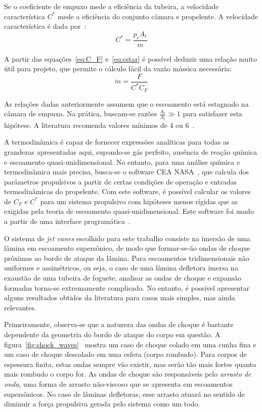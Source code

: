 Se o coeficiente de empuxo mede a eficiência da tubeira, a velocidade característica \(C^*\) mede a eficiência do conjunto câmara e propelente. A velocidade característica é dada por~\cite{Sutton}:
\begin{equation}
    \label{eq:cstar}
    C^* = \frac{p_c A_t}{\dot{m}}
\end{equation}

A partir das equações~\ref{eq:C_F} e~\ref{eq:cstar} é possível deduzir uma relação muito útil para projeto, que permite o cálculo fácil da vazão mássica necessária:
\begin{equation}
    \label{eq:mdot}
    \dot{m} = \frac{F}{C^* C_F}
\end{equation}

As relações dadas anteriormente assumem que o escoamento está estagnado na câmara de empuxo. Na prática, buscam-se razões \(\frac{A_c}{A_t} \gg 1\) para satisfazer esta hipótese. A literatura recomenda valores mínimos de 4 ou 6~\cite{Sutton}.

A termodinâmica é capaz de fornecer expressões analíticas para todas as grandezas apresentadas aqui, supondo-se gás perfeito, ausência de reação química e escoamento quasi-unidimensional. No entanto, para uma análise química e termodinâmica mais precisa, busca-se o software CEA NASA~\cite{ceanasa}, que calcula dos parâmetros propulsivos a partir de certas condições de operação e entradas termodinâmicas do propelente. Com este software, é possível calcular os valores de \(C_F\) e \(C^*\) para um sistema propulsivo com hipóteses menos rígidas que as exigidas pela teoria de escoamento quasi-unidimensional. Este software foi usado a partir de uma interface programática~\cite{rocketcea}.

O sistema de \textit{jet vanes} escolhido para este trabalho consiste na imersão de uma lâmina em escoamento supersônico, de modo que formar-se-ão ondas de choque próximas ao bordo de ataque da lâmina. Para escoamentos tridimensionais não uniformes e assimétricos, ou seja, o caso de uma lâmina defletora imersa na exaustão de uma tubeira de foguete, analisar as ondas de choque e expansão formadas torna-se extremamente complicado. No entanto, é possível apresentar alguns resultados obtidos da literatura para casos mais simples, mas ainda relevantes. 

Primeiramente, observa-se que a natureza das ondas de choque é bastante dependente da geometria do bordo de ataque do corpo em questão. A figura~\ref{fig:shock_waves}~\cite{vandyke} mostra um caso de choque colado em uma cunha fina e um caso de choque descolado em uma esfera (corpo rombudo). Para corpos de espessura finita, estas ondas sempre vão existir, mas serão tão mais fortes quanto mais rombudo o corpo for. As ondas de choque são responsáveis pelo \textit{arrasto de onda}, uma forma de arrasto não-viscoso que se apresenta em escoamentos supersônicos. No caso de lâminas defletoras, esse arrasto atuará no sentido de diminuir a força propulsiva gerada pelo sistema como um todo.

